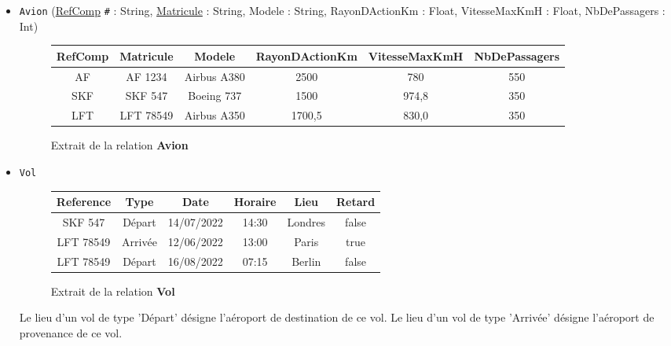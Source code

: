 \documentclass[11pt,a4paper,french,twoside]{PMCours}
\begin{document}
\begin{itemize}
\item \verb'Avion' (\underline{RefComp} \verb'#' : String, \underline{Matricule} : String, Modele : String, RayonDActionKm : Float, VitesseMaxKmH : Float, NbDePassagers : Int)
\begin{figure}[ht]
\begin{center}
\begin{tabular}{|c|c|c|c|c|c|}\hline
RefComp & Matricule & Modele & RayonDActionKm & VitesseMaxKmH & NbDePassagers\\\hline
AF & AF 1234 & Airbus A380 & 2500 & 780 & 550\\\hline
SKF & SKF 547 & Boeing 737 & 1500 & 974,8 & 350\\\hline
LFT & LFT 78549 & Airbus A350 & 1700,5 & 830,0 & 350\\\hline
\end{tabular}
\end{center}
\caption{Extrait de la relation \textbf{Avion}}
\end{figure}
\end{itemize}

\begin{itemize}
\item \verb'Vol' \\
\begin{figure}[ht]
\begin{center}
\begin{tabular}{|c|c|c|c|c|c|}\hline
Reference & Type & Date & Horaire & Lieu & Retard\\\hline
SKF 547 & Départ & 14/07/2022 & 14:30 & Londres & false\\\hline
LFT 78549 & Arrivée & 12/06/2022 & 13:00 & Paris & true\\\hline
LFT 78549 & Départ & 16/08/2022 & 07:15 & Berlin & false\\\hline
\end{tabular}
\end{center}
\caption{Extrait de la relation \textbf{Vol}}
\end{figure}
Le lieu d'un vol de type 'Départ' désigne l'aéroport de destination de ce vol. Le lieu d'un vol de type 'Arrivée' désigne l'aéroport de provenance de ce vol. 
\end{itemize}
\end{document}
